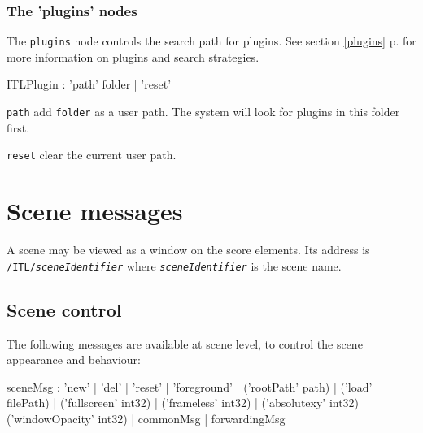 \documentclass[a4paper,twoside]{report}
\newcommand{\toplevel}[1]	{\chapter{#1}}
\newcommand{\sublevel}[1]	{\section{#1}}
\newcommand{\subsublevel}[1]	{\subsection{#1}}
\newcommand{\fullref}[1]	{\ref{#1} p.\pageref{#1}}
\newcommand{\OSC}[1]		{\texttt{#1}}
\let\olditemize\itemize
\let\oldenditemize\enditemize
\renewenvironment{itemize} 	{\olditemize \setlength{\itemsep}{1mm}}{\oldenditemize}
\begin{document}
\subsublevel{The 'plugins' nodes}
\label{ITLplugins}

The \OSC{plugins} node controls the search path for plugins. See section \fullref{plugins} for more information on plugins and search strategies.

\begin{rail}
ITLPlugin : 'path'  folder
		| 'reset'
\end{rail}

\begin{itemize}
\item \OSC{path} add \OSC{folder} as a user path. The system will look for plugins in this folder first.
\item \OSC{reset} clear the current user path.
\end{itemize}


\toplevel{Scene messages}
\label{scene}
A scene may be viewed as a window on the score elements. Its address is \OSC{/ITL/\textit{sceneIdentifier}} where \OSC{\textit{sceneIdentifier}} is the scene name. 

\sublevel{Scene control}
The following messages are available at scene level, to control the scene appearance and behaviour:
\begin{rail}
sceneMsg :  'new'
			| 'del'
			| 'reset'
			| 'foreground'
			| ('rootPath' path) 
			| ('load' filePath)
			| ('fullscreen' int32)
			| ('frameless' int32)
			| ('absolutexy' int32)
			| ('windowOpacity' int32)
			| commonMsg
			| forwardingMsg
\end{rail}
\end{document}
